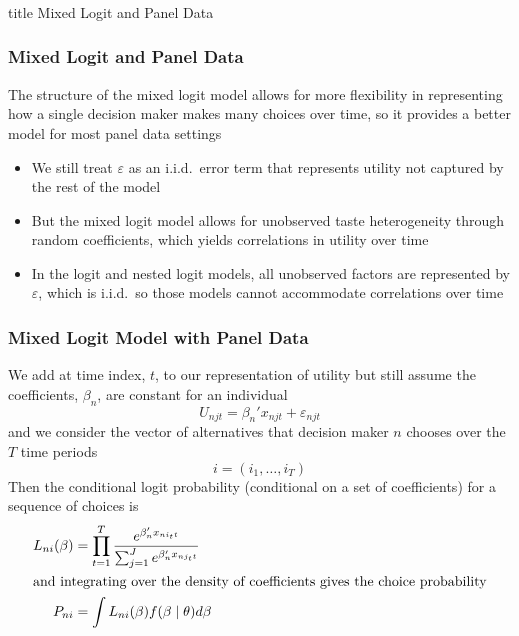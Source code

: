 \documentclass{beamer}
\begin{document}
\begin{frame}\frametitle{}
    \vfill
    \centering
    \begin{beamercolorbox}[center]{title}
        \Large Mixed Logit and Panel Data
    \end{beamercolorbox}
    \vfill
\end{frame}

\begin{frame}\frametitle{Mixed Logit and Panel Data}
    The structure of the mixed logit model allows for more flexibility in representing how a single decision maker makes many choices over time, so it provides a better model for most panel data settings
    \begin{itemize}
        \item We still treat $\varepsilon$ as an i.i.d.\ error term that represents utility not captured by the rest of the model
        \item But the mixed logit model allows for unobserved taste heterogeneity through random coefficients, which yields correlations in utility over time
        \item In the logit and nested logit models, all unobserved factors are represented by $\varepsilon$, which is i.i.d.\, so those models cannot accommodate correlations over time
    \end{itemize}
    \vspace{2ex}

\end{frame}

\begin{frame}\frametitle{Mixed Logit Model with Panel Data}
    We add at time index, $t$, to our representation of utility but still assume the coefficients, $\beta_n$, are constant for an individual
    $$U_{njt} = \beta_n' x_{njt} + \varepsilon_{njt}$$
    and we consider the vector of alternatives that decision maker $n$ chooses over the $T$ time periods
    $$i = (i_1, \ldots, i_T)$$
    Then the conditional logit probability (conditional on a set of coefficients) for a sequence of choices is
    \begin{align*}
        L_{ni}(\beta) &= \prod_{t = 1}^T \frac{e^{\beta_n' x_{ni_{t}t}}}{\sum_{j = 1}^J e^{\beta_n' x_{nj_{t}t}}} \\
        \intertext{and integrating over the density of coefficients gives the choice probability}
        P_{ni} &= \int L_{ni}(\beta) f(\beta \mid \theta) d \beta
    \end{align*}
\end{frame}
\end{document}
